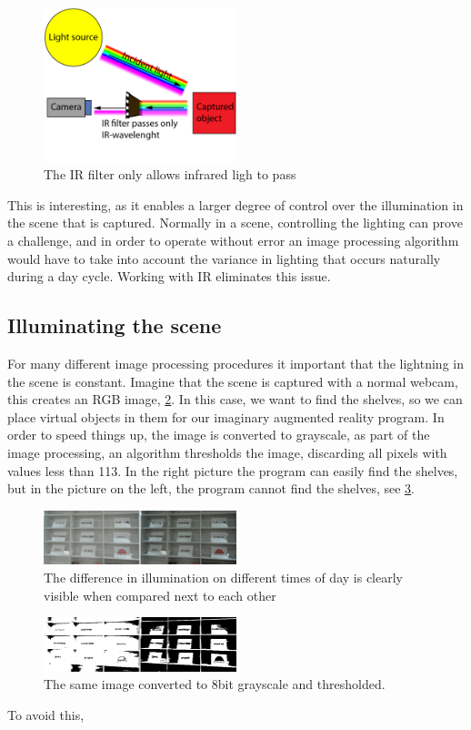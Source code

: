 \begin{figure}[htbp] 
\centering 
\includegraphics[width=0.5\textwidth]{Pictures/Theory/IR_filter.png} 
\caption{The IR filter only allows infrared ligh to pass} 
\label{fig:ir_filter} 
\end{figure}

This is interesting, as it enables a larger degree of control over the illumination in the scene that is captured. Normally in a scene, controlling the lighting   can prove a challenge, and in order to operate without error an image processing algorithm would have to take into account the variance in lighting that occurs naturally during a day cycle. Working with IR eliminates this issue.

\subsection{Illuminating the scene}

For many different image processing procedures it important that the lightning in the scene is constant. Imagine that the scene is captured with a normal webcam, this creates an RGB image, \ref{fig:scene_light}.  In this case, we want to find the shelves, so we can place virtual objects in them for our imaginary augmented reality program. In order to speed things up, the image is converted to grayscale, as part of the  image processing, an algorithm thresholds the image, discarding all pixels with values less than 113. In the right picture the program can easily find the shelves, but in the picture on the left, the program cannot find the shelves, see \ref{fig:scene_thresholded}.

\begin{figure}[htbp] 
\centering 
\includegraphics[width=0.5\textwidth]{Pictures/HjoerringLibrary/scene_lighting.png} 
\caption{The difference in illumination on different times of day is clearly visible when compared next to each other} 
\label{fig:scene_light} 
\end{figure}

\begin{figure}[htbp] 
\centering 
\includegraphics[width=0.5\textwidth]{Pictures/HjoerringLibrary/scene_lighting_thresholded.png} 
\caption{The same image converted to 8bit grayscale and thresholded.} 
\label{fig:scene_thresholded} 
\end{figure}

To avoid this, 